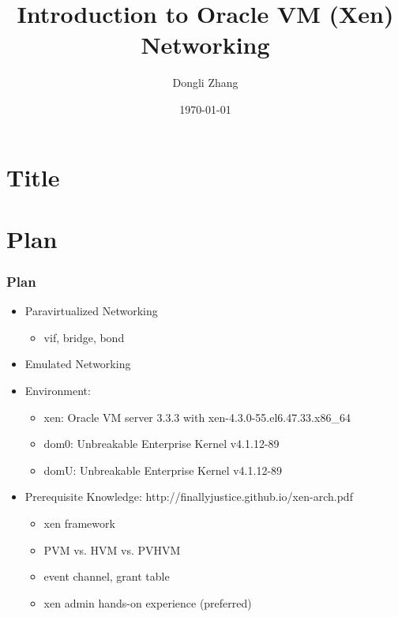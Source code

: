 \documentclass[aspectratio=169]{beamer}
\title[Introduction to Oracle VM (Xen) Networking]{Introduction to Oracle VM (Xen) Networking} %
\author{Dongli Zhang} %
\institute[Oracle] %
{
Oracle Asia Research and Development Centers (Beijing) \\ %
\medskip
\textit{dongli.zhang@oracle.com} %
}
\date{\today} %
\begin{document}

\section{Title}
\begin{frame}
\titlepage %
\end{frame}


\section{Plan}
\begin{frame}
\frametitle{Plan}
\begin{itemize}
\setlength\itemsep{1em}
\item {\large Paravirtualized Networking}
	\begin{itemize}
		\item vif, bridge, bond
	\end{itemize}
\item {\large Emulated Networking}
\item {\large Environment:}
	\begin{itemize}
		\item xen: Oracle VM server 3.3.3 with xen-4.3.0-55.el6.47.33.x86\_64
		\item dom0: Unbreakable Enterprise Kernel v4.1.12-89
		\item domU: Unbreakable Enterprise Kernel v4.1.12-89
	\end{itemize}
\item Prerequisite Knowledge: http://finallyjustice.github.io/xen-arch.pdf
	\begin{itemize}
		\item xen framework
		\item PVM vs. HVM vs. PVHVM
		\item event channel, grant table
		\item xen admin hands-on experience (preferred)
	\end{itemize}
\end{itemize}
\end{frame}

\end{document}
